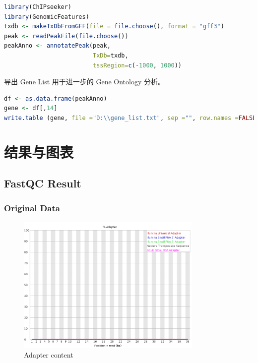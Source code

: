 \documentclass[UTF8]{ctexart}
\begin{document}
\begin{lstlisting}[language=R]
library(ChIPseeker)
library(GenomicFeatures)
txdb <- makeTxDbFromGFF(file = file.choose(), format = "gff3")
peak <- readPeakFile(file.choose())
peakAnno <- annotatePeak(peak,
                         TxDb=txdb,
                         tssRegion=c(-1000, 1000))
\end{lstlisting}

导出 Gene List 用于进一步的 Gene Ontology 分析。

\begin{lstlisting}[language=R]
df <- as.data.frame(peakAnno)
gene <- df[,14]
write.table (gene, file ="D:\\gene_list.txt", sep ="", row.names =FALSE, col.names =FALSE, quote =FALSE)
\end{lstlisting}


\section{结果与图表}

\subsection{FastQC Result}

\subsubsection{Original Data}

\begin{figure}[!htb]
	\centering
	\includegraphics[width=0.8\textwidth]{img/SRR14325859_FastQC_Origin_img/adapter_content.png}	
	\caption{Adapter content\protect}    
\end{figure}
\end{document}
